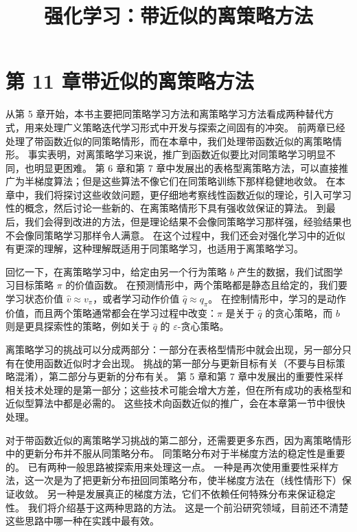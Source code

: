 \documentclass[UTF8,12pt,a4paper,fontset=fandol]{ctexart}
\title{强化学习：带近似的离策略方法}
\author{}
\date{}
\begin{document}
\maketitle

\section*{第 11 章\quad 带近似的离策略方法}

从第 5 章开始，本书主要把同策略学习方法和离策略学习方法看成两种替代方式，用来处理广义策略迭代学习形式中开发与探索之间固有的冲突。
前两章已经处理了带函数近似的同策略情形，而在本章中，我们处理带函数近似的离策略情形。
事实表明，对离策略学习来说，推广到函数近似要比对同策略学习明显不同，也明显更困难。
第 6 章和第 7 章中发展出的表格型离策略方法，可以直接推广为半梯度算法；但是这些算法不像它们在同策略训练下那样稳健地收敛。
在本章中，我们将探讨这些收敛问题，更仔细地考察线性函数近似的理论，引入可学习性的概念，然后讨论一些新的、在离策略情形下具有强收敛保证的算法。
到最后，我们会得到改进的方法，但是理论结果不会像同策略学习那样强，经验结果也不会像同策略学习那样令人满意。
在这个过程中，我们还会对强化学习中的近似有更深的理解，这种理解既适用于同策略学习，也适用于离策略学习。

回忆一下，在离策略学习中，给定由另一个行为策略 $b$ 产生的数据，我们试图学习目标策略 $\pi$ 的价值函数。
在预测情形中，两个策略都是静态且给定的，我们要学习状态价值 $\hat v\approx v_\pi$，或者学习动作价值 $\hat q\approx q_\pi$。
在控制情形中，学习的是动作价值，而且两个策略通常都会在学习过程中改变：$\pi$ 是关于 $\hat q$ 的贪心策略，而 $b$ 则是更具探索性的策略，例如关于 $\hat q$ 的 $\varepsilon$-贪心策略。

离策略学习的挑战可以分成两部分：一部分在表格型情形中就会出现，另一部分只有在使用函数近似时才会出现。
挑战的第一部分与更新目标有关（不要与目标策略混淆），第二部分与更新的分布有关。
第 5 章和第 7 章中发展出的重要性采样相关技术处理的是第一部分；这些技术可能会增大方差，但在所有成功的表格型和近似型算法中都是必需的。
这些技术向函数近似的推广，会在本章第一节中很快处理。

对于带函数近似的离策略学习挑战的第二部分，还需要更多东西，因为离策略情形中的更新分布并不服从同策略分布。
同策略分布对于半梯度方法的稳定性是重要的。
已有两种一般思路被探索用来处理这一点。
一种是再次使用重要性采样方法，这一次是为了把更新分布扭回同策略分布，使半梯度方法在（线性情形下）保证收敛。
另一种是发展真正的梯度方法，它们不依赖任何特殊分布来保证稳定性。
我们将介绍基于这两种思路的方法。
这是一个前沿研究领域，目前还不清楚这些思路中哪一种在实践中最有效。
\end{document}
